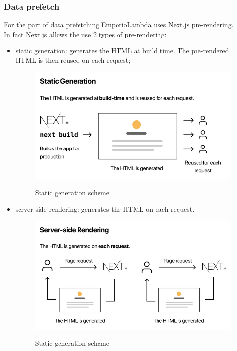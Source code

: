 \subsubsection{Data prefetch}
For the part of data prefetching EmporioLambda uses Next.js pre-rendering.\\
In fact Next.js allows the use 2 types of pre-rendering:
\begin{itemize}
\item static generation: generates the HTML at build time. The pre-rendered HTML is then reused on each request;
\begin{figure}[H]
\centering
\includegraphics[scale=0.70]{res/Architettura/Frontend/img/staticGeneration}\\
\caption{Static generation scheme}
\end{figure}
\vspace{0.7cm}
\item server-side rendering: generates the HTML on each request.
\begin{figure}[H]
\centering
\includegraphics[scale=0.70]{res/Architettura/Frontend/img/serverSideRendering}\\
\caption{Static generation scheme}
\end{figure}
\vspace{0.7cm}
\end{itemize}
